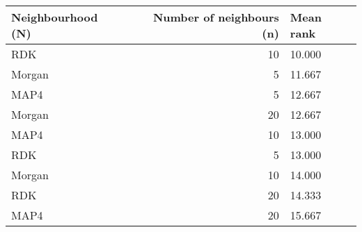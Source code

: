 \begin{tabular}{lrl}
\toprule
Neighbourhood (N) & Number of neighbours (n) & Mean rank \\
\midrule
RDK & 10 & 10.000 \\
Morgan & 5 & 11.667 \\
MAP4 & 5 & 12.667 \\
Morgan & 20 & 12.667 \\
MAP4 & 10 & 13.000 \\
RDK & 5 & 13.000 \\
Morgan & 10 & 14.000 \\
RDK & 20 & 14.333 \\
MAP4 & 20 & 15.667 \\
\bottomrule
\end{tabular}
